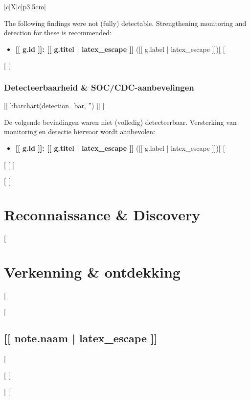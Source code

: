 {{{{\begin{xltabular}{\textwidth}{|c|X|c|p{3.5cm}|}
{The following findings were not (fully) detectable. Strengthening monitoring and detection for these is recommended:

\begin{itemize}
[%
  \item \textbf{[[ g.id ]]: [[ g.titel | latex_escape ]]} ([[ g.label | latex_escape ]])[%
[%
\end{itemize}
[%
[%
\subsubsection*{Detecteerbaarheid \& SOC/CDC-aanbevelingen}
[[ hbarchart(detection_bar, '') ]]
[%

De volgende bevindingen waren niet (volledig) detecteerbaar. Versterking van monitoring en detectie hiervoor wordt aanbevolen:

\begin{itemize}
[%
  \item \textbf{[[ g.id ]]: [[ g.titel | latex_escape ]]} ([[ g.label | latex_escape ]])[%
[%
\end{itemize}
[%
[%
[%

\newpage

[%
[%
\section{Reconnaissance \& Discovery}
[%
\section{Verkenning \& ontdekking}
[%

[%
\subsection{[[ note.naam | latex_escape ]]}

[%

[%
\newpage
[%

[%
[%
}
\end{xltabular}}}}}
